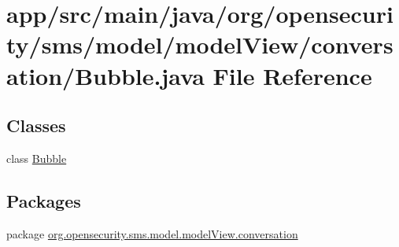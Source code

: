 \hypertarget{a00019}{\section{app/src/main/java/org/opensecurity/sms/model/model\+View/conversation/\+Bubble.java File Reference}
\label{a00019}
}
\subsection*{Classes}
\begin{DoxyCompactItemize}
\item 
class \hyperlink{a00004}{Bubble}
\end{DoxyCompactItemize}
\subsection*{Packages}
\begin{DoxyCompactItemize}
\item 
package \hyperlink{a00037}{org.\+opensecurity.\+sms.\+model.\+model\+View.\+conversation}
\end{DoxyCompactItemize}
